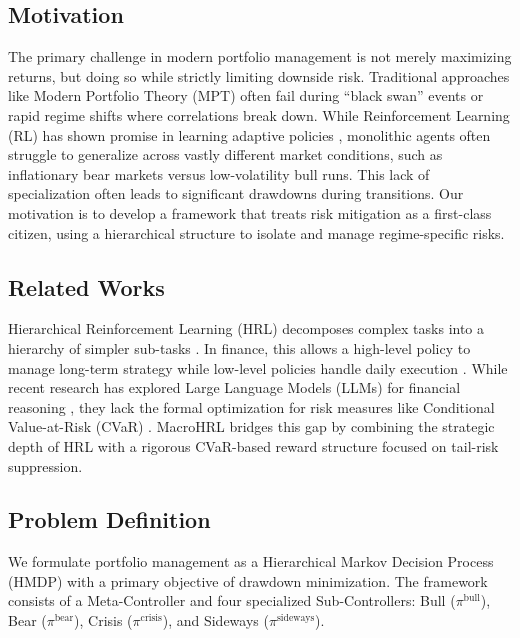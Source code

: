 \documentclass[conference]{IEEEtran}
\begin{document}
\subsection{Motivation}

The primary challenge in modern portfolio management is not merely maximizing returns, but doing so while strictly limiting downside risk. Traditional approaches like Modern Portfolio Theory (MPT) \cite{markowitz1952} often fail during ``black swan'' events or rapid regime shifts where correlations break down. While Reinforcement Learning (RL) has shown promise in learning adaptive policies \cite{jiang2017deep,deng2016deep}, monolithic agents often struggle to generalize across vastly different market conditions, such as inflationary bear markets versus low-volatility bull runs. This lack of specialization often leads to significant drawdowns during transitions. Our motivation is to develop a framework that treats risk mitigation as a first-class citizen, using a hierarchical structure to isolate and manage regime-specific risks.

\subsection{Related Works}

Hierarchical Reinforcement Learning (HRL) decomposes complex tasks into a hierarchy of simpler sub-tasks \cite{sutton1999between}. In finance, this allows a high-level policy to manage long-term strategy while low-level policies handle daily execution \cite{wang2021hierarchical}. While recent research has explored Large Language Models (LLMs) for financial reasoning \cite{liang2023large,wu2023large}, they lack the formal optimization for risk measures like Conditional Value-at-Risk (CVaR) \cite{rockafellar2000optimization}. MacroHRL bridges this gap by combining the strategic depth of HRL with a rigorous CVaR-based reward structure focused on tail-risk suppression.

\subsection{Problem Definition}

We formulate portfolio management as a Hierarchical Markov Decision Process (HMDP) with a primary objective of drawdown minimization. The framework consists of a Meta-Controller and four specialized Sub-Controllers: Bull ($\pi^{\text{bull}}$), Bear ($\pi^{\text{bear}}$), Crisis ($\pi^{\text{crisis}}$), and Sideways ($\pi^{\text{sideways}}$).
\end{document}
